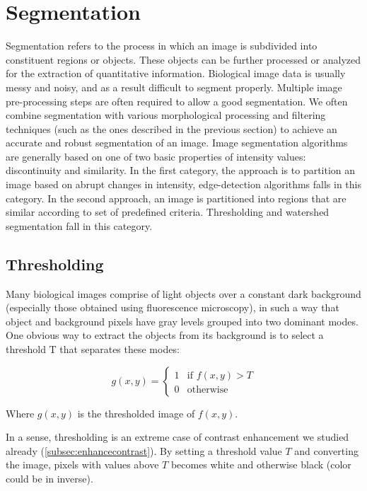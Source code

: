 
\section{Segmentation}
\label{sec:segmentation}

Segmentation refers to the process in which an image is subdivided into
constituent regions or objects. These objects can be further
processed or analyzed for the extraction of quantitative information.
Biological image data is usually messy and noisy, and as a result
difficult to segment properly. Multiple image pre-processing steps are
often required to allow a good segmentation. We often combine segmentation
with various morphological processing and filtering techniques (such as the ones described in the previous section) to achieve an accurate and robust
segmentation of an image.
Image segmentation algorithms are generally based on one of two basic
properties of intensity values: discontinuity and similarity. In the
first category, the approach is to partition an image based on abrupt
changes in intensity, edge-detection algorithms falls in this category. In the second approach, an image is partitioned into
regions that are similar according to set of predefined criteria.
Thresholding and watershed segmentation fall in this category.

\subsection{Thresholding}

Many biological images comprise of light objects over a constant dark
background (especially those obtained using fluorescence microscopy),
in such a way that object and background pixels have gray levels
grouped into two dominant modes. One obvious way to extract the objects
from its background is to select a threshold T that separates these
modes:

\begin{equation}
g(x,y)= 
\begin{cases}
1 & \text{if $f(x, y) > T$}\\
0 & \text{otherwise}
\end{cases}
\end{equation}

Where $g(x,y)$ is the thresholded image of
$f(x,y)$.

In a sense, thresholding is an extreme case of contrast enhancement we
studied already (\ref{subsec:enhancecontrast}). By setting a threshold value $T$ and
converting the image, pixels with values above $T$ becomes white and
otherwise black (color could be in inverse). 

